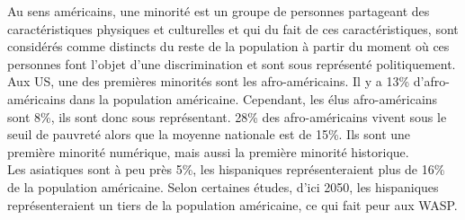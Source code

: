 \documentclass[10pt, a4paper, openany]{book}
\begin{document}
Au sens américains, une minorité est un groupe de personnes partageant des caractéristiques physiques et culturelles et qui du fait de ces caractéristiques, sont considérés comme distincts du reste de la population à partir du moment où ces personnes font l'objet d'une discrimination et sont sous représenté politiquement. \\
Aux US, une des premières minorités sont les afro-américains. Il y a 13\% d'afro-américains dans la population américaine. Cependant, les élus afro-américains sont 8\%, ils sont donc sous représentant. 28\% des afro-américains vivent sous le seuil de pauvreté alors que la moyenne nationale est de 15\%. Ils sont une première minorité numérique, mais aussi la première minorité historique. \\
Les asiatiques sont à peu près 5\%, les hispaniques représenteraient plus de 16\% de la population américaine. Selon certaines études, d'ici 2050, les hispaniques représenteraient un tiers de la population américaine, ce qui fait peur aux WASP.
\end{document}
